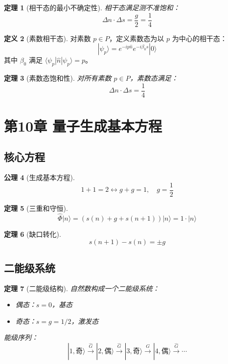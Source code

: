 \documentclass[12pt]{article}
\newtheorem{theorem}{定理}[section]
\theoremstyle{definition}
\newtheorem{definition}[theorem]{定义}
\newtheorem{axiom}[theorem]{公理}
\begin{document}
\begin{theorem}[相干态的最小不确定性]
相干态满足测不准饱和：
\[
\Delta n \cdot \Delta s = \frac{g}{2} = \frac{1}{4}
\]
\end{theorem}

\begin{definition}[素数相干态]
对素数 \(p \in P\)，定义素数态为以 \(p\) 为中心的相干态：
\[
|\psi_p\rangle = e^{-ip\hat{n}} e^{-i\beta_0\hat{s}} |0\rangle
\]
其中 \(\beta_0\) 满足 \(\langle\psi_p|\hat{n}|\psi_p\rangle = p\)。
\end{definition}

\begin{theorem}[素数态饱和性]
对所有素数 \(p \in P\)，素数态满足：
\[
\Delta n \cdot \Delta s = \frac{1}{4}
\]
\end{theorem}

\section{第10章 量子生成基本方程}

\subsection{核心方程}

\begin{axiom}[生成基本方程]
\[
1+1=2 \longleftrightarrow g+g=1,\quad g=\frac{1}{2}
\]
\end{axiom}

\begin{theorem}[三重和守恒]
\[
\hat{\Phi}|n\rangle = (s(n) + g + s(n+1))|n\rangle = 1 \cdot |n\rangle
\]
\end{theorem}

\begin{theorem}[缺口转化]
\[
s(n+1) - s(n) = \pm g
\]
\end{theorem}

\subsection{二能级系统}

\begin{theorem}[二能级结构]
自然数构成一个二能级系统：
\begin{itemize}
    \item 偶态：\(s=0\)，基态
    \item 奇态：\(s=g=1/2\)，激发态
\end{itemize}
能级序列：
\[
|1,\text{奇}\rangle \xrightarrow{\hat{G}} |2,\text{偶}\rangle \xrightarrow{\hat{G}} |3,\text{奇}\rangle \xrightarrow{\hat{G}} |4,\text{偶}\rangle \xrightarrow{\hat{G}} \cdots
\]
\end{theorem}
\end{document}
